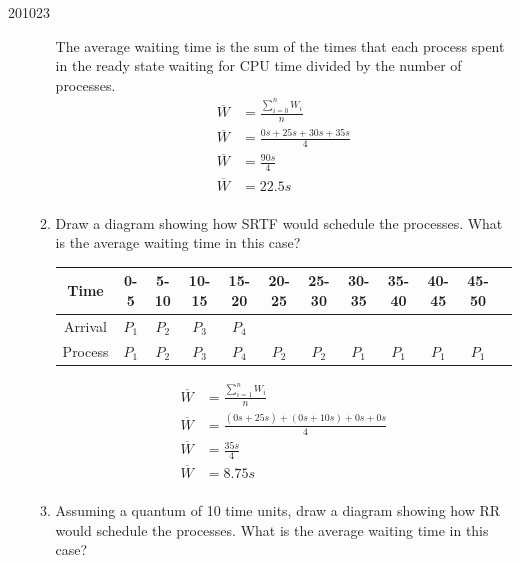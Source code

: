 \documentclass[10pt,\jkfside,a4paper]{article}
\begin{document}
\begin{examquestion}{2010}{2}{3}
\begin{enumerate}
\begin{enumerate}
The average waiting time is the sum of the times that each process spent in the ready state waiting for 
CPU time divided by the number of processes.
\begin{equation*}
\begin{split}
\overline{W} &= \frac{\sum^n_{i=0} W_i}{n}\\
\overline{W} &= \frac{0s + 25s + 30s + 35s}{4}\\
\overline{W} &= \frac{90s}{4}\\
\overline{W} &= 22.5s\\
\end{split}
\end{equation*}

\item  Draw a diagram showing how SRTF would schedule the processes. What
is the average waiting time in this case?

\begin{tabular}{c|ccccccccccc}
Time & 0-5 & 5-10 & 10-15 & 15-20 & 20-25 & 25-30 & 30-35 & 35-40 & 40-45 & 45-50 \\
\hline
Arrival & $P_1$ & $P_2$ & $P_3$ & $P_4$ & & & & & \\
Process & $P_1$ & $P_2$ & $P_3$ & $P_4$ & $P_2$ & $P_2$ & $P_1$ & $P_1$ & $P_1$ & $P_1$ \\
\end{tabular}
\begin{equation*}
\begin{split}
\overline{W} &= \frac{\sum^n_{i=1} W_i}{n}\\
\overline{W} &= \frac{(0s + 25s) + (0s + 10s) + 0s + 0s}{4}\\
\overline{W} &= \frac{35s}{4}\\
\overline{W} &= 8.75s\\
\end{split}
\end{equation*}

\item Assuming a quantum of 10 time units, draw a diagram showing how RR
would schedule the processes. What is the average waiting time in this
case?


\end{enumerate}
\end{enumerate}
\end{examquestion}
\end{document}
